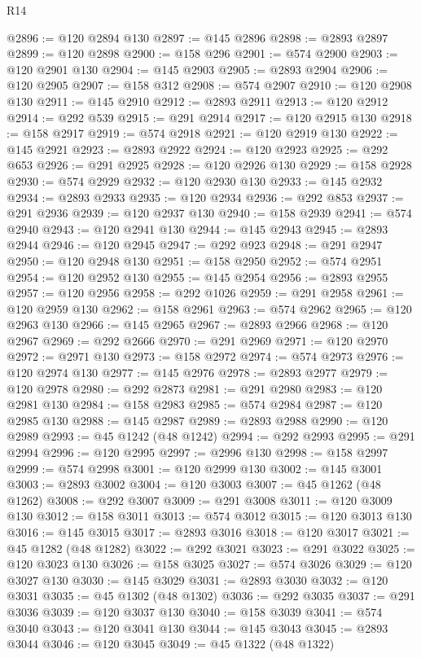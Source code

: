 \begin{lexlean}{R14}
\begin{coremodule}
{{{{{{{{{{{{{{{{{{{{{{{{{{{{{{{{{{{{{{{{{{{{{{{{{{{{{{{{{{{{{{{{{{{{{{{{{{{{{{{{{{{{{{{{{{{{{{{{{{{{{{{{{{@2896 := @120 @2894 @130
@2897 := @145 @2896
@2898 := @2893 @2897
@2899 := @120 @2898
@2900 := @158 @296
@2901 := @574 @2900
@2903 := @120 @2901 @130
@2904 := @145 @2903
@2905 := @2893 @2904
@2906 := @120 @2905
@2907 := @158 @312
@2908 := @574 @2907
@2910 := @120 @2908 @130
@2911 := @145 @2910
@2912 := @2893 @2911
@2913 := @120 @2912
@2914 := @292 @539
@2915 := @291 @2914
@2917 := @120 @2915 @130
@2918 := @158 @2917
@2919 := @574 @2918
@2921 := @120 @2919 @130
@2922 := @145 @2921
@2923 := @2893 @2922
@2924 := @120 @2923
@2925 := @292 @653
@2926 := @291 @2925
@2928 := @120 @2926 @130
@2929 := @158 @2928
@2930 := @574 @2929
@2932 := @120 @2930 @130
@2933 := @145 @2932
@2934 := @2893 @2933
@2935 := @120 @2934
@2936 := @292 @853
@2937 := @291 @2936
@2939 := @120 @2937 @130
@2940 := @158 @2939
@2941 := @574 @2940
@2943 := @120 @2941 @130
@2944 := @145 @2943
@2945 := @2893 @2944
@2946 := @120 @2945
@2947 := @292 @923
@2948 := @291 @2947
@2950 := @120 @2948 @130
@2951 := @158 @2950
@2952 := @574 @2951
@2954 := @120 @2952 @130
@2955 := @145 @2954
@2956 := @2893 @2955
@2957 := @120 @2956
@2958 := @292 @1026
@2959 := @291 @2958
@2961 := @120 @2959 @130
@2962 := @158 @2961
@2963 := @574 @2962
@2965 := @120 @2963 @130
@2966 := @145 @2965
@2967 := @2893 @2966
@2968 := @120 @2967
@2969 := @292 @2666
@2970 := @291 @2969
@2971 := @120 @2970
@2972 := @2971 @130
@2973 := @158 @2972
@2974 := @574 @2973
@2976 := @120 @2974 @130
@2977 := @145 @2976
@2978 := @2893 @2977
@2979 := @120 @2978
@2980 := @292 @2873
@2981 := @291 @2980
@2983 := @120 @2981 @130
@2984 := @158 @2983
@2985 := @574 @2984
@2987 := @120 @2985 @130
@2988 := @145 @2987
@2989 := @2893 @2988
@2990 := @120 @2989
@2993 := @45 @1242 (@48 @1242)
@2994 := @292 @2993
@2995 := @291 @2994
@2996 := @120 @2995
@2997 := @2996 @130
@2998 := @158 @2997
@2999 := @574 @2998
@3001 := @120 @2999 @130
@3002 := @145 @3001
@3003 := @2893 @3002
@3004 := @120 @3003
@3007 := @45 @1262 (@48 @1262)
@3008 := @292 @3007
@3009 := @291 @3008
@3011 := @120 @3009 @130
@3012 := @158 @3011
@3013 := @574 @3012
@3015 := @120 @3013 @130
@3016 := @145 @3015
@3017 := @2893 @3016
@3018 := @120 @3017
@3021 := @45 @1282 (@48 @1282)
@3022 := @292 @3021
@3023 := @291 @3022
@3025 := @120 @3023 @130
@3026 := @158 @3025
@3027 := @574 @3026
@3029 := @120 @3027 @130
@3030 := @145 @3029
@3031 := @2893 @3030
@3032 := @120 @3031
@3035 := @45 @1302 (@48 @1302)
@3036 := @292 @3035
@3037 := @291 @3036
@3039 := @120 @3037 @130
@3040 := @158 @3039
@3041 := @574 @3040
@3043 := @120 @3041 @130
@3044 := @145 @3043
@3045 := @2893 @3044
@3046 := @120 @3045
@3049 := @45 @1322 (@48 @1322)
}}}}}}}}}}}}}}}}}}}}}}}}}}}}}}}}}}}}}}}}}}}}}}}}}}}}}}}}}}}}}}}}}}}}}}}}}}}}}}}}}}}}}}}}}}}}}}}}}}}}}}}}}}
\end{coremodule}
\end{lexlean}
